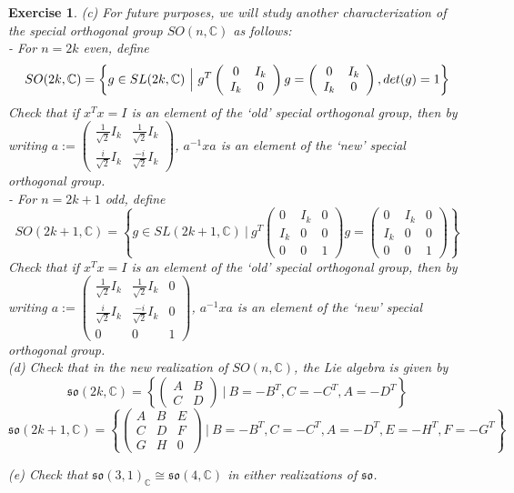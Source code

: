 \documentclass[11pt]{article}
\newtheorem{exercise}[theorem]{Exercise}
\newcommand{\bb}[1]{\mathbb{#1}}
\newcommand{\mf}[1]{\mathfrak{#1}}
\begin{document}
\begin{exercise}
\noindent (c) For future purposes, we will study another characterization of the special orthogonal group $SO(n,\bb{C})$ as follows:\\
- For $n = 2k$ even, define
$$SO(2k,\bb{C}) = \left\{g \in SL(2k,\bb{C})\ \Big|\ g^T \left( \begin{array}{cc}
0 & I_k \\
I_k & 0 \end{array} \right)g = \left( \begin{array}{cc}
0 & I_k \\
I_k & 0 \end{array}\right),\ \\det(g) = 1 \right\}$$
Check that if $x^Tx = I$ is an element of the `old' special orthogonal group, then by writing
$a := \left( \begin{array}{cc}
\frac{1}{\sqrt{2}}I_k & \frac{1}{\sqrt{2}}I_k \\
\frac{i}{\sqrt{2}}I_k & \frac{-i}{\sqrt{2}}I_k \end{array} \right)$, $a^{-1}xa$ is an element of the `new' special orthogonal group.\\
- For $n = 2k+1$ odd, define
$$SO(2k+1,\bb{C}) = \left\{g \in SL(2k+1,\bb{C})\ \Big|\ g^T \left( \begin{array}{ccc}
0 & I_k & 0\\
I_k & 0 & 0 \\
0 & 0 & 1 \end{array} \right)g = \left( \begin{array}{ccc}
0 & I_k & 0\\
I_k & 0 & 0 \\
0 & 0 & 1 \end{array} \right)\right\}$$
Check that if $x^Tx = I$ is an element of the `old' special orthogonal group, then by writing
$a := \left( \begin{array}{ccc}
\frac{1}{\sqrt{2}}I_k & \frac{1}{\sqrt{2}}I_k & 0 \\
\frac{i}{\sqrt{2}}I_k & \frac{-i}{\sqrt{2}}I_k & 0 \\
0 & 0 & 1 \end{array}\right)$, $a^{-1}xa$ is an element of the `new' special orthogonal group.\\

\noindent (d) Check that in the new realization of $SO(n,\bb{C})$, the Lie algebra is given by
$$\mf{so}(2k,\bb{C}) = \left\{ \left( \begin{array}{cc}
A & B \\
C & D \end{array} \right)\ \Big|\ B = -B^T, C = -C^T, A = -D^T \right\}$$
$$\mf{so}(2k+1,\bb{C}) = \left\{ \left( \begin{array}{ccc}
A & B & E\\
C & D & F \\
G & H & 0 \end{array} \right)\ \Big|\ B = -B^T, C = -C^T, A = -D^T, E = -H^T, F = -G^T \right\}$$

\noindent (e) Check that $\mf{so}(3,1)_{\bb{C}} \cong \mf{so}(4,\bb{C})$ in either realizations of $\mf{so}$.
\end{exercise}
\end{document}
